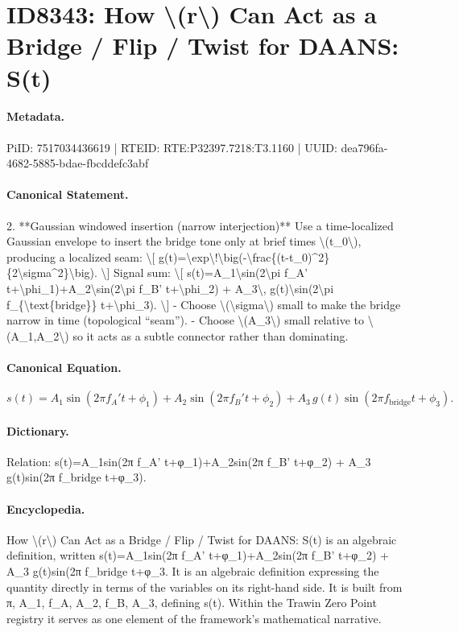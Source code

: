 \section*{ID8343: How \textbackslash{}(r\textbackslash{}) Can Act as a Bridge / Flip / Twist for DAANS: S(t)}
\paragraph{Metadata.}
PiID: 7517034436619 | RTEID: RTE:P32397.7218:T3.1160 | UUID: dea796fa-4682-5885-bdae-fbcddefc3abf

\paragraph{Canonical Statement.}
2. **Gaussian windowed insertion (narrow interjection)** Use a time-localized Gaussian envelope to insert the bridge tone only at brief times \textbackslash{}(t\_0\textbackslash{}), producing a localized seam: \textbackslash{}[ g(t)=\textbackslash{}exp\textbackslash{}!\textbackslash{}big(-\textbackslash{}frac\{(t-t\_0)\textasciicircum{}2\}\{2\textbackslash{}sigma\textasciicircum{}2\}\textbackslash{}big). \textbackslash{}] Signal sum: \textbackslash{}[ s(t)=A\_1\textbackslash{}sin(2\textbackslash{}pi f\_A' t+\textbackslash{}phi\_1)+A\_2\textbackslash{}sin(2\textbackslash{}pi f\_B' t+\textbackslash{}phi\_2) + A\_3\textbackslash{}, g(t)\textbackslash{}sin(2\textbackslash{}pi f\_\{\textbackslash{}text\{bridge\}\} t+\textbackslash{}phi\_3). \textbackslash{}] - Choose \textbackslash{}(\textbackslash{}sigma\textbackslash{}) small to make the bridge narrow in time (topological “seam”). - Choose \textbackslash{}(A\_3\textbackslash{}) small relative to \textbackslash{}(A\_1,A\_2\textbackslash{}) so it acts as a subtle connector rather than dominating.

\paragraph{Canonical Equation.}
\[
s(t)=A_1\sin(2\pi f_A' t+\phi_1)+A_2\sin(2\pi f_B' t+\phi_2) + A_3\, g(t)\sin(2\pi f_{\text{bridge}} t+\phi_3).
\]

\paragraph{Dictionary.}
Relation: s(t)=A\_1sin(2π f\_A' t+φ\_1)+A\_2sin(2π f\_B' t+φ\_2) + A\_3 g(t)sin(2π f\_bridge t+φ\_3).

\paragraph{Encyclopedia.}
How \textbackslash{}(r\textbackslash{}) Can Act as a Bridge / Flip / Twist for DAANS: S(t) is an algebraic definition, written s(t)=A\_1sin(2π f\_A' t+φ\_1)+A\_2sin(2π f\_B' t+φ\_2) + A\_3 g(t)sin(2π f\_bridge t+φ\_3. It is an algebraic definition expressing the quantity directly in terms of the variables on its right-hand side. It is built from π, A\_1, f\_A, A\_2, f\_B, A\_3, defining s(t). Within the Trawin Zero Point registry it serves as one element of the framework's mathematical narrative.
